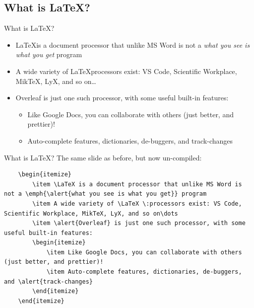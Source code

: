\documentclass[10pt]{beamer}
\begin{document}
\subsection{What is \LaTeX?}
\begin{frame}{What is \LaTeX?}
\begin{itemize}
    \item \LaTeX is a document processor that unlike MS Word is not a \emph{\alert{what you see is what you get}} program 
    \item A wide variety of \LaTeX \:processors exist: VS Code, Scientific Workplace, MikTeX, LyX, and so on\dots 
    \item \alert{Overleaf} is just one such processor, with some useful built-in features:
    \begin{itemize}
        \item Like Google Docs, you can collaborate with others (just better, and prettier)!
        \item Auto-complete features, dictionaries, de-buggers, and \alert{track-changes}
    \end{itemize}
\end{itemize}
\end{frame}

\begin{frame}[fragile]{What is \LaTeX?}
    The same slide as \alert{before}, but now un-compiled:
\begin{lstlisting}
    \begin{itemize}
        \item \LaTeX is a document processor that unlike MS Word is not a \emph{\alert{what you see is what you get}} program 
        \item A wide variety of \LaTeX \:processors exist: VS Code, Scientific Workplace, MikTeX, LyX, and so on\dots 
        \item \alert{Overleaf} is just one such processor, with some useful built-in features:
        \begin{itemize}
            \item Like Google Docs, you can collaborate with others (just better, and prettier)!
            \item Auto-complete features, dictionaries, de-buggers, and \alert{track-changes}
        \end{itemize}
    \end{itemize}
\end{lstlisting}
\end{frame}
\end{document}
